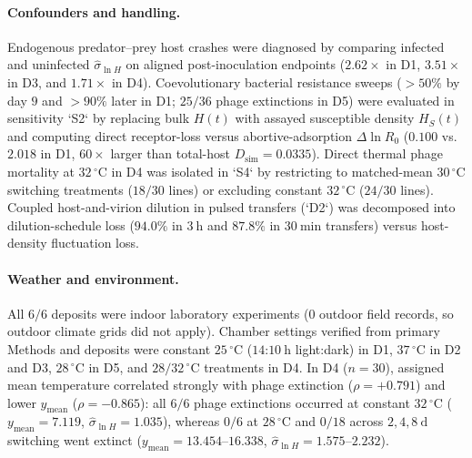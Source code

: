 \paragraph{Confounders and handling.}
Endogenous predator--prey host crashes were diagnosed by comparing infected and uninfected $\hat{\sigma}_{\ln H}$ on aligned post-inoculation endpoints ($2.62\times$ in D1, $3.51\times$ in D3, and $1.71\times$ in D4). Coevolutionary bacterial resistance sweeps ($> 50\%$ by day $9$ and $> 90\%$ later in D1; $25/36$ phage extinctions in D5) were evaluated in sensitivity `S2` by replacing bulk $H(t)$ with assayed susceptible density $H_S(t)$ and computing direct receptor-loss versus abortive-adsorption $\Delta\ln R_0$ ($0.100$ vs.\ $2.018$ in D1, $60\times$ larger than total-host $D_{\mathrm{sim}} = 0.0335$). Direct thermal phage mortality at $32\,^{\circ}\mathrm{C}$ in D4 was isolated in `S4` by restricting to matched-mean $30\,^{\circ}\mathrm{C}$ switching treatments ($18/30$ lines) or excluding constant $32\,^{\circ}\mathrm{C}$ ($24/30$ lines). Coupled host-and-virion dilution in pulsed transfers (`D2`) was decomposed into dilution-schedule loss ($94.0\%$ in $3\ \mathrm{h}$ and $87.8\%$ in $30\ \mathrm{min}$ transfers) versus host-density fluctuation loss.

\paragraph{Weather and environment.}
All $6/6$ deposits were indoor laboratory experiments ($0$ outdoor field records, so outdoor climate grids did not apply). Chamber settings verified from primary Methods and deposits were constant $25\,^{\circ}\mathrm{C}$ ($14\text{:}10\ \mathrm{h}$ light:dark) in D1, $37\,^{\circ}\mathrm{C}$ in D2 and D3, $28\,^{\circ}\mathrm{C}$ in D5, and $28/32\,^{\circ}\mathrm{C}$ treatments in D4. In D4 ($n = 30$), assigned mean temperature correlated strongly with phage extinction ($\rho = +0.791$) and lower $y_{\mathrm{mean}}$ ($\rho = -0.865$): all $6/6$ phage extinctions occurred at constant $32\,^{\circ}\mathrm{C}$ ($y_{\mathrm{mean}} = 7.119$, $\hat{\sigma}_{\ln H} = 1.035$), whereas $0/6$ at $28\,^{\circ}\mathrm{C}$ and $0/18$ across $2, 4, 8\ \mathrm{d}$ switching went extinct ($y_{\mathrm{mean}} = 13.454$--$16.338$, $\hat{\sigma}_{\ln H} = 1.575$--$2.232$).

